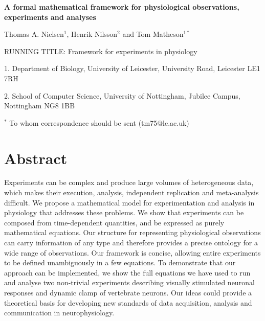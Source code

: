 \documentclass[11pt]{article}
\author{Thomas A. Nielsen, Henrik Nilsson and Tom Matheson}
\begin{document}
\begin{titlepage}

\vspace{50 mm}
\begin{center}{\LARGE {\bf A formal mathematical framework for
  physiological observations, experiments and analyses}}
\end{center}
\vspace{50 mm}

\begin{center}{\large Thomas A. Nielsen$^{1}$, Henrik Nilsson$^2$ and Tom Matheson$^{1*}$}
\end{center}
\vspace{27 mm}

\begin{flushleft}
RUNNING TITLE: Framework for experiments in physiology
\end{flushleft}

\vspace{27 mm}


\begin{flushleft}
1. Department of Biology, University of Leicester, University Road, Leicester LE1 7RH

2. School of Computer Science, University of Nottingham, Jubilee Campus, Nottingham NG8 1BB
\vspace{50 mm}

$^*$ To whom correspondence should be sent (tm75@le.ac.uk)

\end{flushleft}

\end{titlepage}
\section*{Abstract}
 
Experiments can be complex and produce large volumes of heterogeneous
data, which makes their execution, analysis, independent replication
and meta-analysis difficult. We propose a mathematical model for
experimentation and analysis in physiology that addresses these
problems. We show that experiments can be composed from time-dependent
quantities, and be expressed as purely mathematical equations. Our
structure for representing physiological observations can carry
information of any type and therefore provides a precise ontology for
a wide range of observations. Our framework is concise, allowing
entire experiments to be defined unambiguously in a few equations. To
demonstrate that our approach can be implemented, we show the full
equations we have used to run and analyse two non-trivial experiments
describing visually stimulated neuronal responses and dynamic clamp of
vertebrate neurons. Our ideas could provide a theoretical basis for
developing new standards of data acquisition, analysis and
communication in neurophysiology.
\end{document}
